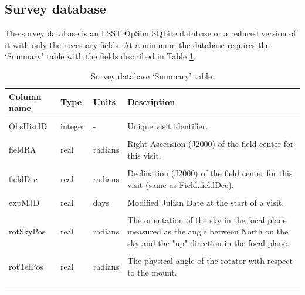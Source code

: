 \documentclass[10pt,a4paper]{article}
\begin{document}
\subsection{Survey database}

The survey database is an LSST OpSim SQLite database or a reduced
version of it with only the necessary fields. At a minimum the database
requires the `Summary' table with the fields described in Table
\ref{tab:sumdesc}.

\begin{longtable}{l l p{20mm} p{50mm}}
    \hline
    Column name                   & Type     & Units   & Description\\
    \hline \hline \\
    ObsHistID                     & integer  & -       & Unique visit identifier. \\ \\
    fieldRA                       & real     & radians & Right Ascension (J2000) of the field center for this visit. \\ \\
    fieldDec                      & real     & radians & Declination (J2000) of the field center for this visit (same as Field.fieldDec).\\ \\
    expMJD                        & real     & days    & Modified Julian Date at the start of a visit. \\ \\
    rotSkyPos                     & real     & radians & The orientation of the sky in the focal plane measured 
                                                         as the angle between North on the sky and the "up" direction 
                                                         in the focal plane. \\ \\
    rotTelPos                     & real     & radians & The physical angle of the rotator with respect to the mount. \\ \\
\hline \\


\caption{Survey database `Summary' table.}
\label{tab:sumdesc}                                                                   
\end{longtable}
\end{document}
